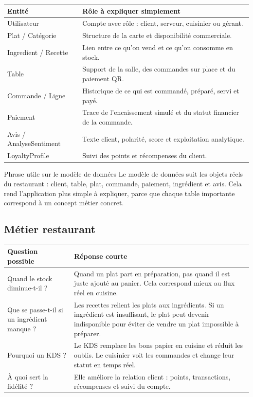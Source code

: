 \documentclass[10pt,a4paper]{article}
\begin{document}
\begin{tabularx}{\textwidth}{p{4.2cm}Y}
\toprule
\textbf{Entité} & \textbf{Rôle à expliquer simplement} \\
\midrule
Utilisateur & Compte avec rôle : client, serveur, cuisinier ou gérant. \\
Plat / Catégorie & Structure de la carte et disponibilité commerciale. \\
Ingredient / Recette & Lien entre ce qu'on vend et ce qu'on consomme en stock. \\
Table & Support de la salle, des commandes sur place et du paiement QR. \\
Commande / Ligne & Historique de ce qui est commandé, préparé, servi et payé. \\
Paiement & Trace de l'encaissement simulé et du statut financier de la commande. \\
Avis / AnalyseSentiment & Texte client, polarité, score et exploitation analytique. \\
LoyaltyProfile & Suivi des points et récompenses du client. \\
\bottomrule
\end{tabularx}

\begin{phrasebox}{Phrase utile sur le modèle de données}
Le modèle de données suit les objets réels du restaurant : client, table, plat, commande, paiement, ingrédient et avis. Cela rend l'application plus simple à expliquer, parce que chaque table importante correspond à un concept métier concret.
\end{phrasebox}

\subsection{Métier restaurant}

\begin{tabularx}{\textwidth}{p{5cm}Y}
\toprule
\textbf{Question possible} & \textbf{Réponse courte} \\
\midrule
Quand le stock diminue-t-il ? & Quand un plat part en préparation, pas quand il est juste ajouté au panier. Cela correspond mieux au flux réel en cuisine. \\
Que se passe-t-il si un ingrédient manque ? & Les recettes relient les plats aux ingrédients. Si un ingrédient est insuffisant, le plat peut devenir indisponible pour éviter de vendre un plat impossible à préparer. \\
Pourquoi un KDS ? & Le KDS remplace les bons papier en cuisine et réduit les oublis. Le cuisinier voit les commandes et change leur statut en temps réel. \\
À quoi sert la fidélité ? & Elle améliore la relation client : points, transactions, récompenses et suivi du compte. \\
\bottomrule
\end{tabularx}
\end{document}

